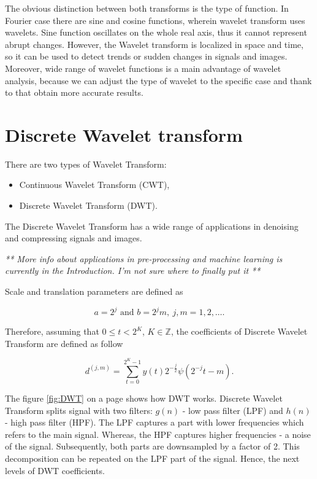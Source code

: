The obvious distinction between both transforms is the type of function. In Fourier case there are sine and cosine functions, wherein wavelet transform uses wavelets. Sine function oscillates on the whole real axis, thus it cannot represent abrupt changes. However, the Wavelet transform is localized in space and time, so it can be used to detect trends or sudden changes in signals and images. Moreover, wide range of wavelet functions is a main advantage of wavelet analysis, because we can adjust the type of wavelet to the specific case and thank to that obtain more accurate results.

\section{Discrete Wavelet transform}

There are two types of Wavelet Transform:
\begin{itemize}
	\item Continuous Wavelet Transform (CWT),
	\item Discrete Wavelet Transform (DWT).
\end{itemize}

The Discrete Wavelet Transform has a wide range of applications in denoising and compressing signals and images.

\textit{** More info about applications in pre-processing and machine learning is currently in the Introduction. I'm not sure where to finally put it **}

Scale and translation parameters are defined as

\begin{equation}
a = 2^j \text{ and } b = 2^j m,\ j,m=1,2,\ldots.
\end{equation}

Therefore, assuming that $0 \leq t < 2^K$, $K \in \mathbb{Z}$, the coefficients of Discrete Wavelet Transform are defined as follow

\begin{equation}
d^{(j,m)}=\sum_{t=0}^{2^K -1} y(t) 2^{-\frac{j}{2}} \psi\left(2^{-j}t - m\right).
\end{equation}

The figure \ref{fig:DWT} on a page \pageref{fig:DWT} shows how DWT works. Discrete Wavelet Transform splits signal with two filters: $g(n)$ - low pass filter (LPF) and $h(n)$ - high pass filter (HPF). The LPF captures a part with lower frequencies which refers to the main signal. Whereas, the HPF captures higher frequencies - a noise of the signal. Subsequently, both parts are downsampled by a factor of 2. This decomposition can be repeated on the LPF part of the signal. Hence, the next levels of DWT coefficients.

